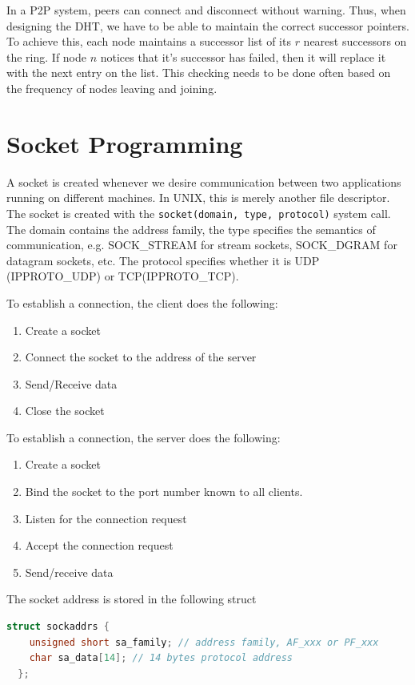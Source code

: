 \documentclass[12pt,letterpaper]{amsbook}
\theoremstyle{definition}
\begin{document}
In a P2P system, peers can connect and disconnect without warning. Thus, when designing the DHT, we have to be able to maintain the correct successor pointers. To achieve this, each node maintains a successor list of its $r$ nearest successors on the ring. If node $n$ notices that it's successor has failed, then it will replace it with the next entry on the list. This checking needs to be done often based on the frequency of nodes leaving and joining.

\section{Socket Programming}

A socket is created whenever we desire communication between two applications running on different machines. In UNIX, this is merely another file descriptor. The socket is created with the \texttt{socket(domain, type, protocol)} system call. The domain contains the address family, the type specifies the semantics of communication, e.g. SOCK\_STREAM for stream sockets, SOCK\_DGRAM for datagram sockets, etc. The protocol specifies whether it is UDP (IPPROTO\_UDP) or TCP(IPPROTO\_TCP).

To establish a connection, the client does the following:

\begin{enumerate}
  \item Create a socket
  \item Connect the socket to the address of the server
  \item Send/Receive data
  \item Close the socket
\end{enumerate}

To establish a connection, the server does the following:

\begin{enumerate}
  \item Create a socket
  \item Bind the socket to the port number known to all clients.
  \item Listen for the connection request
  \item Accept the connection request
  \item Send/receive data
\end{enumerate}

The socket address is stored in the following struct

\begin{lstlisting}[language=c]
  struct sockaddrs {
    unsigned short sa_family; // address family, AF_xxx or PF_xxx
    char sa_data[14]; // 14 bytes protocol address
  };
\end{lstlisting}
\end{document}
